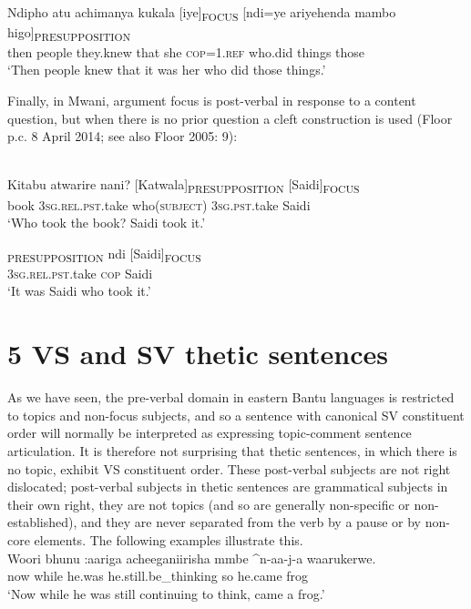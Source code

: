\documentclass[output=paper]{langsci/langscibook}
\begin{document}
\ea\label{ex:}
\\
\gll Ndipho atu achimanya kukala [iye]\textsubscript{FOCUS} [ndi=ye ariyehenda mambo higo]\textsubscript{PRESUPPOSITION}\\
then people they.knew that she \textsc{cop=1.ref} who\textsc{.}did things those\\


\glt \textup{‘}\textup{Then people knew that it was her who did those things.’}
\z

Finally, in Mwani, argument focus is post-verbal in response to a content question, but when there is no prior question a cleft construction is used (Floor p.c. 8 April 2014; see also Floor 2005: 9):

\ea\label{ex:}
\\
\gll Kitabu atwarire nani? [Katwala]\textsubscript{PRESUPPOSITION} [Saidi]\textsubscript{FOCUS}\\
book 3\textsc{sg.rel.pst}.take who(\textsc{subject}) 3\textsc{sg.pst}.take Saidi\\


\glt \textup{‘}\textup{Who took the book? Saidi took it.’}
\z

\ea
\gll [Atwarire]\textsubscript{PRESUPPOSITION} ndi [Saidi]\textsubscript{FOCUS}\\
\textsc{3sg.rel.pst}.take \textsc{cop }Saidi\\


\glt \textup{‘}\textup{It was Saidi who took it.’}
\z

\section{5  VS and SV thetic sentences}
As we have seen, the pre-verbal domain in eastern Bantu languages is restricted to topics and non-focus subjects, and so a sentence with canonical SV constituent order will normally be interpreted as expressing topic-comment sentence articulation. It is therefore not surprising that thetic sentences, in which there is no topic, exhibit VS constituent order. These post-verbal subjects are not right dislocated; post-verbal subjects in thetic sentences are grammatical subjects in their own right, they are not topics (and so are generally non-specific or non-established), and they are never separated from the verb by a pause or by non-core elements. The following examples illustrate this.
\ea\label{ex:}
\\
\gll Woori bhunu :aariga acheeganiirisha mmbe \^{}n-aa-j-a waarukerwe.\\
now while he.was he.still.be\_thinking so he.came frog\\
‘Now while he was still continuing to think, came a frog.’
\z
\end{document}
